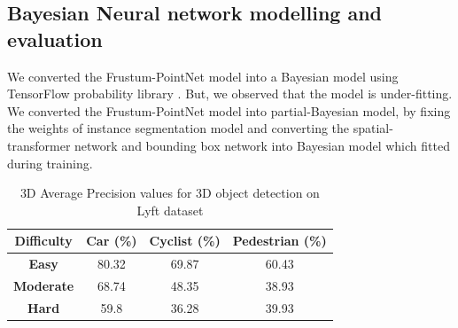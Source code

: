 \documentclass[10pt,twocolumn,letterpaper]{article}
\begin{document}
\subsection{Bayesian Neural network modelling and evaluation}
We converted the Frustum-PointNet model into a Bayesian model using TensorFlow probability library \cite{Tran2019}. But, we observed that the model is under-fitting. We converted the Frustum-PointNet model into partial-Bayesian model, by fixing the weights of instance segmentation model and converting the spatial-transformer network and bounding box network into Bayesian model which fitted during training.
\begin{table}[!htbp]
    \caption[3D AP calculated for 2D proposals generated from 3D Annotations]{3D Average Precision values for 3D object detection on Lyft dataset \label{3DAP Values-1} \cite{Lyft2019}}
    \centering
    \begin{tabular}{|c|c|c|c|}
        \hline \textbf{Difficulty} & \textbf{Car (\%)} & \textbf{Cyclist (\%)} & \textbf{Pedestrian (\%)}  \\
        \hline \textbf{Easy} & 80.32  & 69.87  & 60.43 \\
        \hline \textbf{Moderate} & 68.74  & 48.35 & 38.93 \\
        \hline \textbf{Hard} & 59.8  & 36.28  & 39.93  \\
        \hline
    \end{tabular}
    \end{table}
\end{document}
